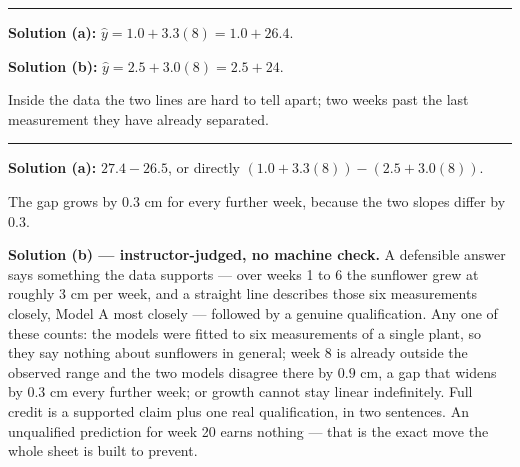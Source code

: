 \documentclass[12pt]{article}
\begin{document}
\vspace{0.15cm}\noindent\rule{\linewidth}{0.2pt}\vspace{0.15cm}


\textbf{Solution (a):} $\hat{y} = 1.0 + 3.3(8) = 1.0 + 26.4$. 

\textbf{Solution (b):} $\hat{y} = 2.5 + 3.0(8) = 2.5 + 24$. 

Inside the data the two lines are hard to tell apart; two weeks past the last
measurement they have already separated.

\vspace{0.15cm}\noindent\rule{\linewidth}{0.2pt}\vspace{0.15cm}


\textbf{Solution (a):} $27.4 - 26.5$, or directly
$\left(1.0 + 3.3(8)\right) - \left(2.5 + 3.0(8)\right)$. 

The gap grows by $0.3$ cm for every further week, because the two slopes differ
by $0.3$.

\textbf{Solution (b) --- instructor-judged, no machine check.} A defensible
answer says something the data supports --- over weeks 1 to 6 the sunflower grew
at roughly 3 cm per week, and a straight line describes those six measurements
closely, Model A most closely --- followed by a genuine qualification. Any one of
these counts: the models were fitted to six measurements of a single plant, so
they say nothing about sunflowers in general; week 8 is already outside the
observed range and the two models disagree there by $0.9$ cm, a gap that widens
by $0.3$ cm every further week; or growth cannot stay linear indefinitely. Full
credit is a supported claim plus one real qualification, in two sentences. An
unqualified prediction for week 20 earns nothing --- that is the exact move the
whole sheet is built to prevent.
\end{document}
